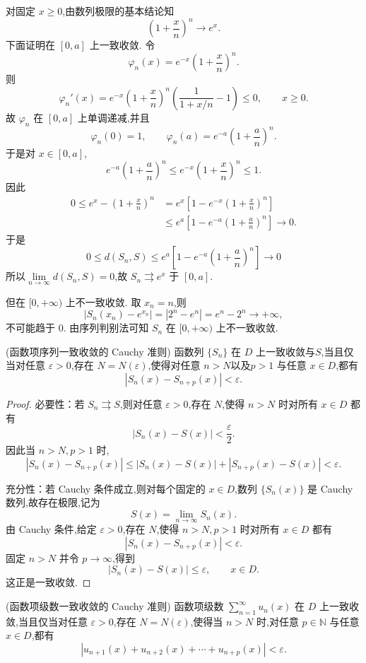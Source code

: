 \begin{solution}
	对固定 $x\geq0$,由数列极限的基本结论知
	\[
	\left(1+\frac{x}{n}\right)^n\to e^x.
	\]
	下面证明在 $[0,a]$ 上一致收敛. 令
	\[
	\varphi_n(x)=e^{-x}\left(1+\frac{x}{n}\right)^n.
	\]
	则
	\[
	\varphi_n'(x)
	=e^{-x}\left(1+\frac{x}{n}\right)^n\left(\frac1{1+x/n}-1\right)
	\leq0,
	\qquad x\geq0.
	\]
	故 $\varphi_n$ 在 $[0,a]$ 上单调递减,并且
	\[
	\varphi_n(0)=1,
	\qquad
	\varphi_n(a)=e^{-a}\left(1+\frac an\right)^n.
	\]
	于是对 $x\in[0,a]$,
	\[
	e^{-a}\left(1+\frac an\right)^n\leq e^{-x}\left(1+\frac xn\right)^n\leq1.
	\]
	因此
	\[
	\begin{aligned}
		0\leq e^x-\left(1+\frac xn\right)^n
		&=e^x\left[1-e^{-x}\left(1+\frac xn\right)^n\right]\\
		&\leq e^a\left[1-e^{-a}\left(1+\frac an\right)^n\right]\to0.
	\end{aligned}
	\]
	于是
	\[0\leqslant d(S_n,S)\leqslant e^a\left[1-e^{-a}\left(1+\frac an\right)^n\right]\to0 \]
	所以$\lim\limits_{n\to\infty}d(S_n,S)=0$,故 $S_n\rightrightarrows e^x$ 于 $[0,a]$.
	
	但在 $[0,+\infty)$ 上不一致收敛. 取 $x_n=n$,则
	\[
	\left|S_n(x_n)-e^{x_n}\right|=|2^n-e^n|=e^n-2^n\to+\infty,
	\]
	不可能趋于 $0$. 由序列判别法可知 $S_n$ 在 $[0,+\infty)$ 上不一致收敛.
\end{solution}
\begin{theorem}(函数项序列一致收敛的 Cauchy 准则)
	函数列 $\{S_n\}$ 在 $D$ 上一致收敛与$S$,当且仅当对任意 $\varepsilon>0$,存在 $N=N(\varepsilon)$,使得对任意 $n>N$以及$p>1$ 与任意 $x\in D$,都有
	\[
	|S_n(x)-S_{n+p}(x)|<\varepsilon.
	\]
\end{theorem}

\begin{proof}
	必要性：若 $S_n\rightrightarrows S$,则对任意 $\varepsilon>0$,存在 $N$,使得 $n>N$ 时对所有 $x\in D$ 都有
	\[
	|S_n(x)-S(x)|<\frac{\varepsilon}{2}.
	\]
	因此当 $n>N,p>1$ 时,
	\[
	|S_n(x)-S_{n+p}(x)|\leq |S_n(x)-S(x)|+|S_{n+p}(x)-S(x)|<\varepsilon.
	\]
	
	充分性：若 Cauchy 条件成立,则对每个固定的 $x\in D$,数列 $\{S_n(x)\}$ 是 Cauchy 数列,故存在极限,记为
	\[
	S(x)=\lim_{n\to\infty}S_n(x).
	\]
	由 Cauchy 条件,给定 $\varepsilon>0$,存在 $N$,使得 $n>N,p>1$ 时对所有 $x\in D$ 都有
	\[
	|S_n(x)-S_{n+p}(x)|<\varepsilon.
	\]
	固定 $n>N$ 并令 $p\to\infty$,得到
	\[
	|S_n(x)-S(x)|\leq \varepsilon,
	\qquad x\in D.
	\]
	这正是一致收敛.
\end{proof}
\begin{proposition}
	(函数项级数一致收敛的 Cauchy 准则)
	函数项级数 $\sum\limits_{n=1}^{\infty}u_n(x)$ 在 $D$ 上一致收敛,当且仅当对任意 $\varepsilon>0$,存在 $N=N(\varepsilon)$,使得当 $n>N$ 时,对任意 $p\in\mathbb{N}$ 与任意 $x\in D$,都有
	\[
	\left|u_{n+1}(x)+u_{n+2}(x)+\cdots+u_{n+p}(x)\right|<\varepsilon.
	\]
\end{proposition}

